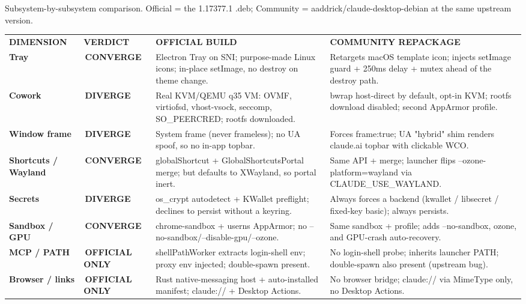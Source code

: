\documentclass[11pt]{article}
\newcommand{\mono}{\ttfamily}
\newcommand{\code}[1]{{\mono\small #1}}
\newcommand{\tabcap}[1]{{\mono\color{faint}\fontsize{8.4}{11}\selectfont #1\par}\vspace{5pt}}
\newcommand{\thd}[1]{{\mono\bfseries\footnotesize\color{white}\MakeUppercase{#1}}}
\newcommand{\tname}[1]{\textbf{\color{base700}#1}}
\newcommand{\badge}[2]{{\mono\bfseries\fontsize{7.4}{8}\selectfont\colorbox{#1}{\color{white}\,\MakeUppercase{#2}\,}}}
\newcommand{\bsame}{\badge{base700}{converge}}
\newcommand{\bdiff}{\badge{accent}{diverge}}
\newcommand{\bofc}{\badge{base600}{official only}}
\begin{document}
\begin{table}[H]
\tabcap{Subsystem-by-subsystem comparison. Official = the 1.17377.1 .deb; Community = aaddrick/claude-desktop-debian at the same upstream version.}
\setlength{\tabcolsep}{6pt}\renewcommand{\arraystretch}{1.28}
\noindent\begin{tabular}{@{}>{\raggedright\arraybackslash}p{22mm} p{20mm} >{\raggedright\arraybackslash}p{69mm} >{\raggedright\arraybackslash}p{63mm}@{}}
\rowcolor{base800}
\thd{Dimension} & \thd{Verdict} & \thd{Official build} & \thd{Community repackage} \\
\tname{Tray} & \bsame & Electron Tray on SNI; purpose-made Linux icons; in-place \code{setImage}, no destroy on theme change. & Retargets macOS template icon; injects \code{setImage} guard + 250ms delay + mutex ahead of the destroy path. \\
\tname{Cowork} & \bdiff & Real KVM/QEMU q35 VM: OVMF, virtiofsd, vhost-vsock, seccomp, \code{SO\_PEERCRED}; rootfs downloaded. & \code{bwrap} host-direct by default, opt-in KVM; rootfs download disabled; second AppArmor profile. \\
\tname{Window frame} & \bdiff & System frame (never frameless); no UA spoof, so no in-app topbar. & Forces \code{frame:true}; UA "hybrid" shim renders claude.ai topbar with clickable WCO. \\
\tname{Shortcuts / Wayland} & \bsame & \code{globalShortcut} + \code{GlobalShortcutsPortal} merge; but defaults to XWayland, so portal inert. & Same API + merge; launcher flips \code{--ozone-platform=wayland} via \code{CLAUDE\_USE\_WAYLAND}. \\
\tname{Secrets} & \bdiff & \code{os\_crypt} autodetect + KWallet preflight; declines to persist without a keyring. & Always forces a backend (kwallet / libsecret / fixed-key basic); always persists. \\
\tname{Sandbox / GPU} & \bsame & 4755 \code{chrome-sandbox} + \code{userns} AppArmor; no \code{--no-sandbox}/\code{--disable-gpu}/\code{--ozone}. & Same sandbox + profile; adds \code{--no-sandbox}, ozone, and GPU-crash auto-recovery. \\
\tname{MCP / PATH} & \bofc & \code{shellPathWorker} extracts login-shell env; proxy env injected; double-spawn present. & No login-shell probe; inherits launcher PATH; double-spawn also present (upstream bug). \\
\tname{Browser / links} & \bofc & Rust native-messaging host + auto-installed manifest; \code{claude://} + Desktop Actions. & No browser bridge; \code{claude://} via MimeType only, no Desktop Actions. \\

\end{tabular}
\end{table}
\end{document}
